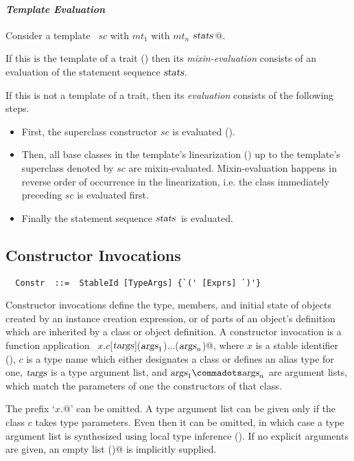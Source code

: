 \paragraph{\em Template Evaluation}
Consider a template ~\lstinline@$sc$ with $mt_1$ with $mt_n$ {$\mbox{\sl stats}\,$}@.

If this is the template of a trait () then its {\em
mixin-evaluation} consists of an evaluation of the statement sequence
$\mbox{\sl stats}$.

If this is not a template of a trait, then its {\em evaluation}
consists of the following steps.
\begin{itemize}
\item
First, the superclass constructor $sc$ is evaluated ().
\item
Then, all base classes in the template's linearization
() up to the
template's superclass denoted by $sc$ are
mixin-evaluated. Mixin-evaluation happens in reverse order of
occurrence in the linearization, i.e. the class immediately preceding
$sc$ is evaluated first.
\item 
Finally the statement sequence $\mbox{\sl stats}\,$ is evaluated.
\end{itemize}

\subsection{Constructor Invocations}
\label{sec:constr-invoke}
\syntax\begin{lstlisting}
  Constr  ::=  StableId [TypeArgs] {`(' [Exprs] `)'}
\end{lstlisting}

Constructor invocations define the type, members, and initial state of
objects created by an instance creation expression, or of parts of an
object's definition which are inherited by a class or object
definition. A constructor invocation is a function application
~\lstinline@$x$.$c$[$\mbox{\sl targs}$]($\mbox{\sl args}_1$)$\ldots$($\mbox{\sl args}_n$)@, where $x$ is a stable identifier
(), $c$ is a type name which either designates a
class or defines an alias type for one, $\mbox{\sl targs}$ is a type argument
list, and $\args_1 \commadots \args_n$ are argument lists, which match
the parameters of one the constructors of that class. 

The prefix `\lstinline@$x$.@' can be omitted.  A type argument list
can be given only if the class $c$ takes type parameters.  Even then
it can be omitted, in which case a type argument list is synthesized
using local type inference (). If no explicit
arguments are given, an empty list \lstinline@()@ is implicitly supplied.

